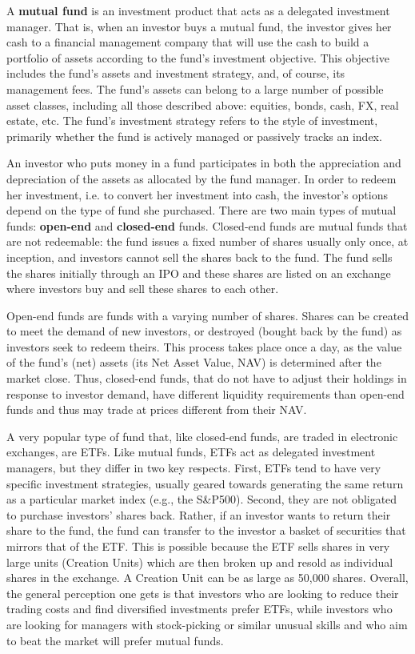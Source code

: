 \documentclass[11pt]{article}
\begin{document}
A \textbf{mutual fund} is an investment product that acts as a delegated investment manager. That is, when an
investor buys a mutual fund, the investor gives her cash to a financial management company that will
use the cash to build a portfolio of assets according to the fund's investment objective. This
objective includes the fund's assets and investment strategy, and, of course, its management fees. The
fund's assets can belong to a large number of possible asset classes, including all those described
above: equities, bonds, cash, FX, real estate, etc. The fund's investment strategy refers to the style
of investment, primarily whether the fund is actively managed or passively tracks an index.

An investor who puts money in a fund participates in both the appreciation and depreciation of the
assets as allocated by the fund manager. In order to redeem her investment, i.e. to convert her
investment into cash, the investor's options depend on the type of fund she purchased. There are two
main types of mutual funds: \textbf{open-end} and \textbf{closed-end} funds. Closed-end funds are mutual funds that are
not redeemable: the fund issues a fixed number of shares usually only once, at inception, and
investors cannot sell the shares back to the fund. The fund sells the shares initially through an IPO
and these shares are listed on an exchange where investors buy and sell these shares to each other.

Open-end funds are funds with a varying number of shares. Shares can be created to meet the demand of
new investors, or destroyed (bought back by the fund) as investors seek to redeem theirs. This process
takes place once a day, as the value of the fund's (net) assets (its Net Asset Value, NAV) is
determined after the market close. Thus, closed-end funds, that do not have to adjust their holdings
in response to investor demand, have different liquidity requirements than open-end funds and thus may
trade at prices different from their NAV.

A very popular type of fund that, like closed-end funds, are traded in electronic exchanges, are ETFs.
Like mutual funds, ETFs act as delegated investment managers, but they differ in two key respects.
First, ETFs tend to have very specific investment strategies, usually geared towards generating the
same return as a particular market index (e.g., the S\&P500). Second, they are not obligated to
purchase investors' shares back. Rather, if an investor wants to return their share to the fund, the
fund can transfer to the investor a basket of securities that mirrors that of the ETF. This is
possible because the ETF sells shares in very large units (Creation Units) which are then broken up
and resold as individual shares in the exchange. A Creation Unit can be as large as 50,000 shares.
Overall, the general perception one gets is that investors who are looking to reduce their trading
costs and find diversified investments prefer ETFs, while investors who are looking for managers with
stock-picking or similar unusual skills and who aim to beat the market will prefer mutual funds.
\end{document}
